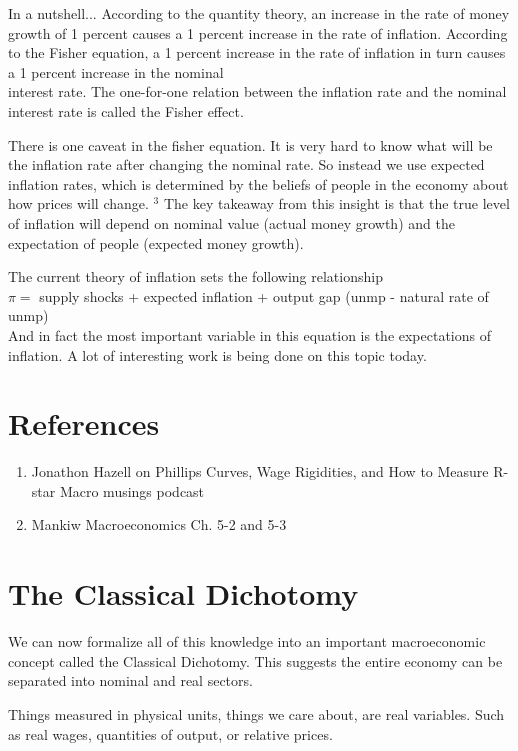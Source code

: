 \documentclass[10pt]{article}
\begin{document}
In a nutshell... According to the quantity theory, an increase in the rate of money growth of 1 percent causes a 1 percent increase in the rate of inflation. According to the Fisher equation, a 1 percent increase in the rate of inflation in turn causes a 1 percent increase in the nominal\\
interest rate. The one-for-one relation between the inflation rate and the nominal interest rate is called the Fisher effect.

There is one caveat in the fisher equation. It is very hard to know what will be the inflation rate after changing the nominal rate. So instead we use expected inflation rates, which is determined by the beliefs of people in the economy about how prices will change. ${ }^{3}$ The key takeaway from this insight is that the true level of inflation will depend on nominal value (actual money growth) and the expectation of people (expected money growth).

The current theory of inflation sets the following relationship\\
$\pi=$ supply shocks + expected inflation + output gap (unmp - natural rate of unmp)\\
And in fact the most important variable in this equation is the expectations of inflation. A lot of interesting work is being done on this topic today.

\section*{References}
\begin{enumerate}
  \item Jonathon Hazell on Phillips Curves, Wage Rigidities, and How to Measure R-star Macro musings podcast
  \item Mankiw Macroeconomics Ch. 5-2 and 5-3
\end{enumerate}

\section*{The Classical Dichotomy}
We can now formalize all of this knowledge into an important macroeconomic concept called the Classical Dichotomy. This suggests the entire economy can be separated into nominal and real sectors.

Things measured in physical units, things we care about, are real variables. Such as real wages, quantities of output, or relative prices.
\end{document}
